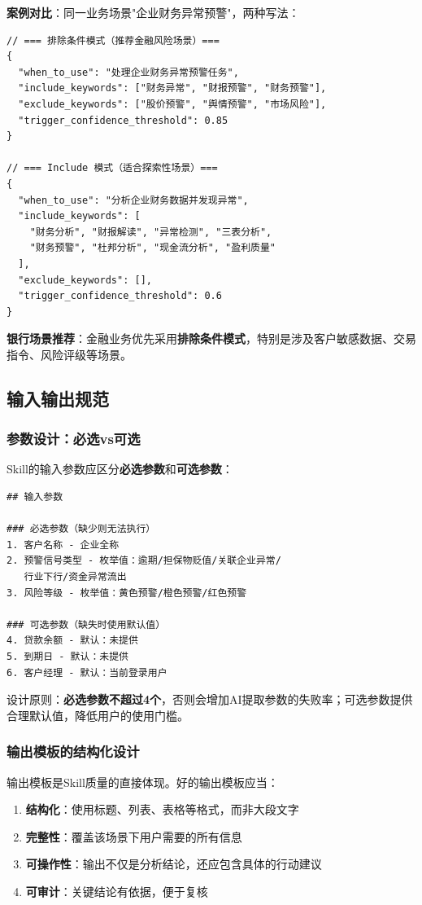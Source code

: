 \textbf{案例对比}：同一业务场景"企业财务异常预警"，两种写法：

\begin{lstlisting}[style=json]
// === 排除条件模式（推荐金融风险场景）===
{
  "when_to_use": "处理企业财务异常预警任务",
  "include_keywords": ["财务异常", "财报预警", "财务预警"],
  "exclude_keywords": ["股价预警", "舆情预警", "市场风险"],
  "trigger_confidence_threshold": 0.85
}

// === Include 模式（适合探索性场景）===
{
  "when_to_use": "分析企业财务数据并发现异常",
  "include_keywords": [
    "财务分析", "财报解读", "异常检测", "三表分析",
    "财务预警", "杜邦分析", "现金流分析", "盈利质量"
  ],
  "exclude_keywords": [],
  "trigger_confidence_threshold": 0.6
}
\end{lstlisting}

\textbf{银行场景推荐}：金融业务优先采用\textbf{排除条件模式}，特别是涉及客户敏感数据、交易指令、风险评级等场景。

\subsection{输入输出规范}

\subsubsection{参数设计：必选vs可选}

Skill的输入参数应区分\textbf{必选参数}和\textbf{可选参数}：

\begin{lstlisting}
## 输入参数

### 必选参数（缺少则无法执行）
1. 客户名称 - 企业全称
2. 预警信号类型 - 枚举值：逾期/担保物贬值/关联企业异常/
   行业下行/资金异常流出
3. 风险等级 - 枚举值：黄色预警/橙色预警/红色预警

### 可选参数（缺失时使用默认值）
4. 贷款余额 - 默认：未提供
5. 到期日 - 默认：未提供
6. 客户经理 - 默认：当前登录用户
\end{lstlisting}

设计原则：\textbf{必选参数不超过4个}，否则会增加AI提取参数的失败率；可选参数提供合理默认值，降低用户的使用门槛。

\subsubsection{输出模板的结构化设计}

输出模板是Skill质量的直接体现。好的输出模板应当：
\begin{enumerate}[leftmargin=2em]
  \item \textbf{结构化}：使用标题、列表、表格等格式，而非大段文字
  \item \textbf{完整性}：覆盖该场景下用户需要的所有信息
  \item \textbf{可操作性}：输出不仅是分析结论，还应包含具体的行动建议
  \item \textbf{可审计}：关键结论有依据，便于复核
\end{enumerate}


